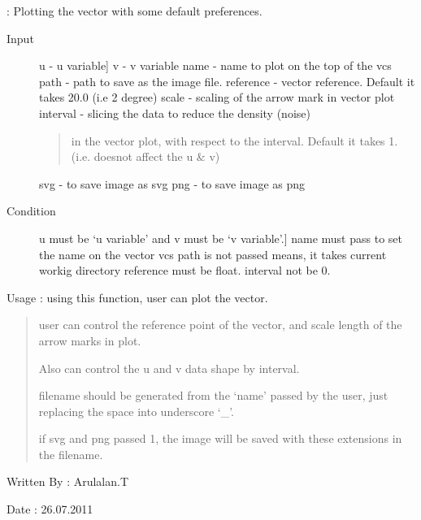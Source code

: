 \documentclass[letterpaper,10pt,english]{sphinxmanual}
\begin{document}
\begin{fulllineitems}
\label{diagnosisutils:plot.vectorPlot}
{\hyperref[diagnosisutils:plot.vectorPlot]{}}: Plotting the vector with some default preferences.
\begin{description}
\item[{Input}] \leavevmode{[}u - u variable{]}
v - v variable
name - name to plot on the top of the vcs
path - path to save as the image file.
reference - vector reference. Default it takes 20.0 (i.e 2 degree)
scale - scaling of the arrow mark in vector plot
interval - slicing the data to reduce the density (noise)
\begin{quote}

in the vector plot, with respect to the interval.
Default it takes 1. (i.e. doesnot affect the u \& v)
\end{quote}

svg - to save image as svg
png - to save image as png

\item[{Condition}] \leavevmode{[}u must be `u variable' and v must be `v variable'.{]}
name must pass to set the name on the vector vcs
path is not passed means, it takes current workig directory
reference must be float.
interval not be 0.

\end{description}

Usage : using this function, user can plot the vector.
\begin{quote}

user can control the reference point of the vector, and scale
length of the arrow marks in plot.

Also can control the u and v data shape by interval.

filename should be generated from the `name' passed by the user,
just replacing the space into underscore `\_'.

if svg and png passed 1, the image will be saved with these
extensions in the filename.
\end{quote}

Written By : Arulalan.T

Date : 26.07.2011

\end{fulllineitems}
\end{document}
